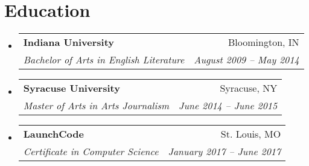 \documentclass[letterpaper,11pt]{article}
\makeatletter
\newcommand{\resumeSubheading}[4]{
  \vspace{-2pt}\item
    \begin{tabular*}{0.97\textwidth}[t]{l@{\extracolsep{\fill}}r}
      \textbf{#1} & #2 \\
      \textit{\small#3} & \textit{\small #4} \\
    \end{tabular*}\vspace{-7pt}
}
\newcommand{\resumeSubHeadingListStart}{\begin{itemize}[leftmargin=0.15in, label={}]}
\newcommand{\resumeSubHeadingListEnd}{\end{itemize}}
\makeatother
\begin{document}
\section{Education}
  \resumeSubHeadingListStart
    \resumeSubheading
      {Indiana University}{Bloomington, IN}
      {Bachelor of Arts in English Literature}{August 2009 -- May 2014}
    \resumeSubheading
      {Syracuse University}{Syracuse, NY}
      {Master of Arts in Arts Journalism}{June 2014 -- June 2015}
    \resumeSubheading
      {LaunchCode}{St. Louis, MO}
      {Certificate in Computer Science}{January 2017 -- June 2017}
  \resumeSubHeadingListEnd


\end{document}
